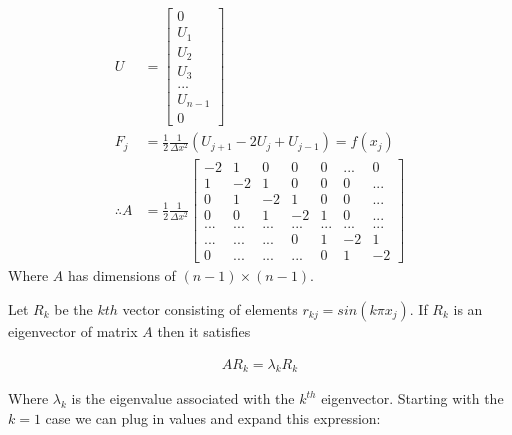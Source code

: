 \documentclass{article}
\newcommand{\n}{\newline}
\begin{document}
	\begin{align*}
		U&=\begin{bmatrix}
			0\\
			U_{1}\\
			U_{2}\\
			U_{3}\\
			...\\
			U_{n-1}\\
			0
			\end{bmatrix}\\
		F_j&=\frac{1}{2}\frac{1}{\Delta x^{2}}(U_{j+1}-2U_{j}+U_{j-1})=f(x_j)\\
		\therefore A&=\frac{1}{2}\frac{1}{\Delta x^{2}}\begin{bmatrix}
		-2 & 1 & 0 & 0 & 0 & ... & 0\\
		1 & -2 & 1 & 0 & 0 & 0 & ...\\
		0 & 1 & -2 & 1 & 0 & 0 & ... \\
		0 & 0 & 1 & -2 & 1 & 0 & ... \\
		... & ... & ... & ... & ... & ... & ... \\
		... & ... & ... & 0 & 1 & -2 & 1 \\
		0 & ... & ... & ... & 0 & 1 & -2 
		\end{bmatrix}
	\end{align*}
	Where $A$ has dimensions of $(n-1)\times (n-1)$.  \n
	
	Let $R_{k}$ be the $kth$ vector consisting of elements $r_{kj}=sin(k\pi x_{j})$.  If $R_{k}$ is an eigenvector of matrix $A$ then it satisfies
	
	\begin{align*}
		AR_{k}=\lambda_{k}R_{k}
	\end{align*}  
	
	Where $\lambda_{k}$ is the eigenvalue associated with the $k^{th}$ eigenvector.  Starting with the $k=1$ case we can plug in values and expand this expression:
	
\end{document}
